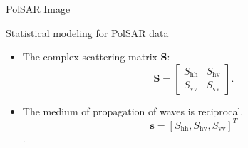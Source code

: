 \documentclass[10pt]{beamer}
\begin{document}
\begin{frame}[fragile]{PolSAR Image}
\begin{alertblock}{Statistical modeling for PolSAR data}
\begin{itemize}
\item The complex scattering matrix $\mathbf{S}$:
\begin{equation}
\mathbf{S} = \left[
\begin{array}{cc}
	S_\text{hh}   & S_\text{hv}   \\
	S_\text{vv}   & S_\text{vv}   
\end{array}
\right].
\end{equation}\label{eq_01}
\item The medium of propagation of waves is reciprocal.
$$\mathbf{s}=[S_\text{hh},S_\text{hv},S_{\text{vv}}]^T$$.
\end{itemize}
\end{alertblock}
\end{frame}
\end{document}
